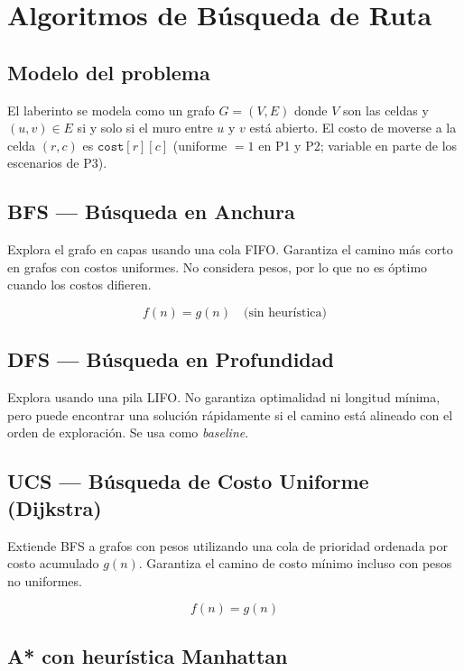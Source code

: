 \documentclass[12pt,a4paper]{article}
\begin{document}
\section{Algoritmos de Búsqueda de Ruta}

\subsection{Modelo del problema}

El laberinto se modela como un grafo $G=(V,E)$ donde $V$ son las
celdas y $(u,v)\in E$ si y solo si el muro entre $u$ y $v$ está
abierto. El costo de moverse a la celda $(r,c)$ es
$\texttt{cost}[r][c]$ (uniforme $=1$ en P1 y P2; variable en parte
de los escenarios de P3).

\subsection{BFS — Búsqueda en Anchura}

Explora el grafo en capas usando una cola FIFO. Garantiza el camino
más corto en grafos con costos uniformes. No considera pesos, por lo
que no es óptimo cuando los costos difieren.

\[
  f(n) = g(n) \quad \text{(sin heurística)}
\]

\subsection{DFS — Búsqueda en Profundidad}

Explora usando una pila LIFO. No garantiza optimalidad ni longitud
mínima, pero puede encontrar una solución rápidamente si el camino
está alineado con el orden de exploración. Se usa como \emph{baseline}.

\subsection{UCS — Búsqueda de Costo Uniforme (Dijkstra)}

Extiende BFS a grafos con pesos utilizando una cola de prioridad
ordenada por costo acumulado $g(n)$. Garantiza el camino de costo
mínimo incluso con pesos no uniformes.

\[
  f(n) = g(n)
\]

\subsection{A* con heurística Manhattan}
\end{document}
